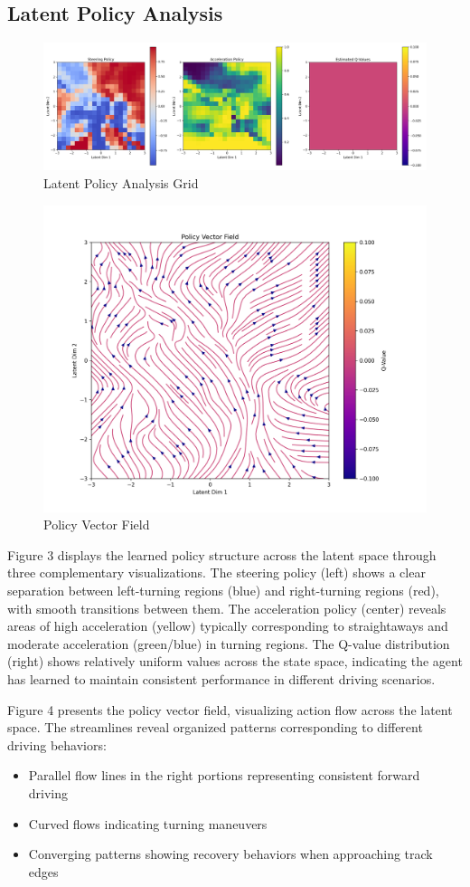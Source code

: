 \documentclass[conference]{IEEEtran}
\begin{document}
\subsection{Latent Policy Analysis}
\begin{figure}
    \centering
    \includegraphics[width=0.75\linewidth]{Writeup/latent-grid.png}
    \caption{Latent Policy Analysis Grid}
    \label{fig:enter-label}
\end{figure}
\begin{figure}
    \centering
    \includegraphics[width=0.75\linewidth]{Writeup/policy-vector-field.png}
    \caption{Policy Vector Field}
    \label{fig:enter-label}
\end{figure}
Figure 3 displays the learned policy structure across the latent space through three complementary visualizations. The steering policy (left) shows a clear separation between left-turning regions (blue) and right-turning regions (red), with smooth transitions between them. The acceleration policy (center) reveals areas of high acceleration (yellow) typically corresponding to straightaways and moderate acceleration (green/blue) in turning regions. The Q-value distribution (right) shows relatively uniform values across the state space, indicating the agent has learned to maintain consistent performance in different driving scenarios.

Figure 4 presents the policy vector field, visualizing action flow across the latent space. The streamlines reveal organized patterns corresponding to different driving behaviors:
\begin{itemize}
    \item Parallel flow lines in the right portions representing consistent forward driving
    \item Curved flows indicating turning maneuvers
    \item Converging patterns showing recovery behaviors when approaching track edges
\end{itemize}
\end{document}
